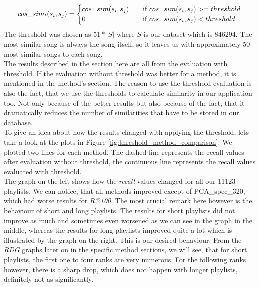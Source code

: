 \[   
cos\_sim_t(s_i,s_j) = 
     \begin{cases}
       \text{$ cos\_sim(s_i,s_j) $} &\quad\text{if $ cos\_sim(s_i,s_j)  >= threshold$}\\
       \text{$ 0 $} &\quad\text{if $ cos\_sim(s_i,s_j)  < threshold$}\\
     \end{cases}
\]
 The threshold was chosen as $ 51 * |S| $ where $ S $ is our dataset which is 846294. The most similar song is always the song itself, so it leaves us with approximately 50 most similar songs to each song. \\
The results described in the section here are all from the evaluation with threshold. If the evaluation without threshold was better for a method, it is mentioned in the method's section. The reason to use the threshold-evaluation is also the fact, that we use the thresholds to calculate similarity in our application too. Not only because of the better results but also because of the fact, that it dramatically reduces the number of similarities that have to be stored in our database.\\
To give an idea about how the results changed with applying the threshold, lets take a look at the plots in Figure \ref{fig:threshold_method_comparison}. We plotted two lines for each method. The dashed line represents the recall values after evaluation without threshold, the continuous line represents the recall values evaluated with threshold. \\
The graph on the left shows how the \textit{recall} values changed for all our 11123 playlists. We can notice, that all methods improved except of PCA\_spec\_320, which had worse results for \textit{R@100}. The most crucial remark here however is the behaviour of short and long playlists. The results for short playlists did not improve as much and sometimes even worsened as we can see in the graph in the middle, whereas the results for long playlists improved quite a lot which is illustrated by the graph on the right. This is our desired behaviour. From the \textit{RDG} graphs later on in the specific method sections, we will see, that for short playlists, the first one to four ranks are very numerous. For the following ranks however, there is a sharp drop, which does not happen with longer playlists, definitely not as significantly. \\


